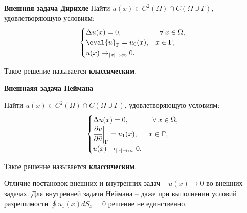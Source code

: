 \begin{minipage}{0.4\textwidth}
{\bf Внешняя задача Дирихле}
Найти $u(x) \in C^2(\Omega) \cap C(\Omega \cup \Gamma)$, удовлетворяющую условиям:
\[
\begin{cases}
\Delta u(x) = 0, & \Forall x \in \Omega, \\
\eval{u}_{\Gamma} = u_0(x), & x \in \Gamma, \\
u(x) \rightarrow_{|x|\rightarrow \infty} 0.
\end{cases}
\]

Такое решение называется {\bf классическим}.

\end{minipage}
\hfill
\begin{minipage}{0.4\textwidth}
{\bf Внешнаяя задача Неймана}

Найти $u(x) \in C^2(\Omega) \cap C(\Omega \cup \Gamma)$, удовлетворяющую условиям:
\[
\begin{cases}
\Delta u(x) = 0, & \;\;\forall\: x \in \Omega, \\
\cfrac{\partial v}{\partial \vec n}\bigg|_{\Gamma} = u_1(x), & x \in \Gamma, \\
u(x) \rightarrow_{|x|\rightarrow \infty} 0.
\end{cases}
\]

Такое решение называется {\bf классическим}.

\end{minipage}




Отличие постановок внешних и внутренних задач -- $u(x) \rightarrow 0$ во внешних задачах. Для внутренней задачи Неймана -- даже при выполнении условий разрешимости $\oint u_1(x) dS_x = 0$ решение не единственно.

